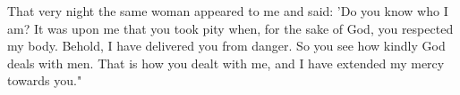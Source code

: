 That very night the same woman appeared to me and said: 'Do
you know who I am? It was upon me that you took pity when, for
the sake of God, you respected my body.
Behold, I have delivered
you from danger.
So you see how kindly God deals with men.
That
is how you dealt with me, and I have extended my mercy towards
you."

